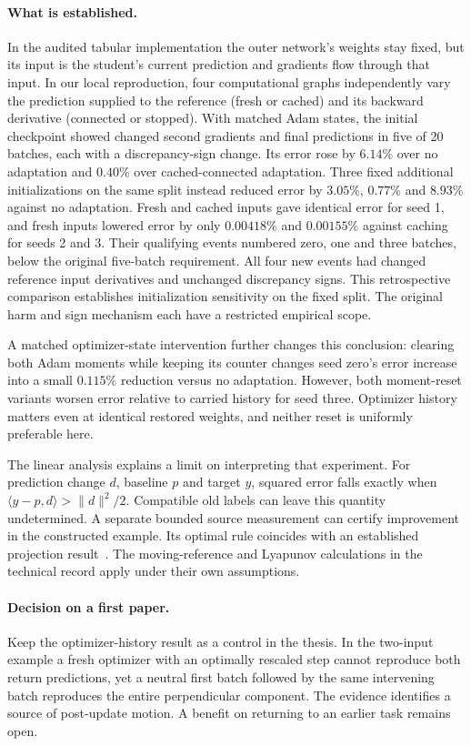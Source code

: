\documentclass[11pt,a4paper]{article}
\begin{document}
\paragraph{What is established.}
In the audited tabular implementation the outer network's weights stay
fixed, but its input is the student's current prediction and gradients
flow through that input. In our local reproduction, four computational
graphs independently vary the prediction supplied to the reference
(fresh or cached) and its backward derivative (connected or stopped).
With matched Adam states, the initial checkpoint showed changed second
gradients and final predictions in five of 20 batches, each with a
discrepancy-sign change. Its error rose by $6.14\%$ over no adaptation
and $0.40\%$ over cached-connected adaptation. Three fixed additional
initializations on the same split instead reduced error by $3.05\%$,
$0.77\%$ and $8.93\%$ against no adaptation. Fresh and cached inputs
gave identical error for seed 1, and fresh inputs lowered error by only
$0.00418\%$ and $0.00155\%$ against caching for seeds 2 and 3.
Their qualifying events numbered zero, one and three batches, below
the original five-batch requirement. All four new events had changed
reference input derivatives and unchanged discrepancy signs.
This retrospective comparison establishes initialization sensitivity
on the fixed split. The original harm and sign mechanism each have
a restricted empirical scope.

A matched optimizer-state intervention further changes this conclusion:
clearing both Adam moments while keeping its counter changes seed zero's
error increase into a small $0.115\%$ reduction versus no adaptation.
However, both moment-reset variants worsen error relative to carried
history for seed three. Optimizer history matters even at identical
restored weights, and neither reset is uniformly preferable here.

The linear analysis explains a limit on interpreting that experiment.
For prediction change $d$, baseline $p$ and target $y$, squared error
falls exactly when $\langle y-p,d\rangle>\|d\|^2/2$. Compatible old
labels can leave this quantity undetermined. A separate bounded source
measurement can certify improvement in the constructed example. Its
optimal rule coincides with an established projection result~\cite{safer}.
The moving-reference and Lyapunov calculations in the technical record
apply under their own assumptions.

\paragraph{Decision on a first paper.}
Keep the optimizer-history result as a control in the thesis. In the
two-input example a fresh optimizer with an optimally rescaled step
cannot reproduce both return predictions, yet a neutral first batch
followed by the same intervening batch reproduces the entire perpendicular
component. The evidence identifies a source of post-update motion.
A benefit on returning to an earlier task remains open.
\end{document}
